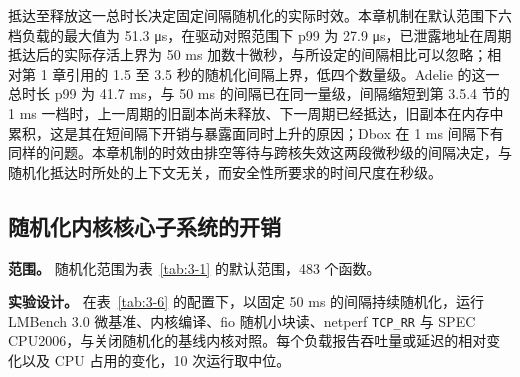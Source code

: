 抵达至释放这一总时长决定固定间隔随机化的实际时效。本章机制在默认范围下六档负载的最大值为 51.3 μs，在驱动对照范围下 p99 为 27.9 μs，已泄露地址在周期抵达后的实际存活上界为 50 ms 加数十微秒，与所设定的间隔相比可以忽略；相对第 1 章引用的 1.5 至 3.5 秒的随机化间隔上界，低四个数量级。Adelie 的这一总时长 p99 为 41.7 ms，与 50 ms 的间隔已在同一量级，间隔缩短到第 3.5.4 节的 1 ms 一档时，上一周期的旧副本尚未释放、下一周期已经抵达，旧副本在内存中累积，这是其在短间隔下开销与暴露面同时上升的原因；Dbox 在 1 ms 间隔下有同样的问题。本章机制的时效由排空等待与跨核失效这两段微秒级的间隔决定，与随机化抵达时所处的上下文无关，而安全性所要求的时间尺度在秒级。

\subsection{随机化内核核心子系统的开销}

\textbf{范围。} 随机化范围为表~\ref{tab:3-1} 的默认范围，483 个函数。

\textbf{实验设计。} 在表~\ref{tab:3-6} 的配置下，以固定 50 ms 的间隔持续随机化，运行 LMBench 3.0 微基准、内核编译、fio 随机小块读、netperf \lstinline[breaklines=false]@TCP_RR@ 与 SPEC CPU2006，与关闭随机化的基线内核对照。每个负载报告吞吐量或延迟的相对变化以及 CPU 占用的变化，10 次运行取中位。

\begin{table}[!htbp]
    \label{tab:3-10}
    \centering
    \scriptsize
    \setlength{\tabcolsep}{3pt}
    \renewcommand{\arraystretch}{1.25}
\end{table}

